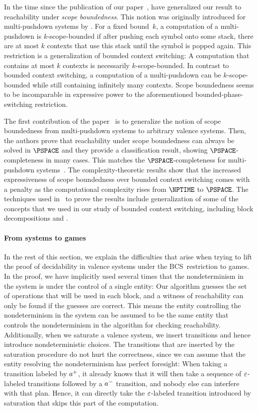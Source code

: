 \documentclass[../../diss.tex]{subfiles}
\begin{document}
In the time since the publication of our paper~\cite{MeyerMZ18},  have generalized our result to reachability under \emph{scope boundedness}.
This notion was originally introduced for multi-pushdown systems by .
For a fixed bound~$k$, a computation of a multi-pushdown is $k$-scope-bounded if after pushing each symbol onto some stack, there are at most $k$ contexts that use this stack until the symbol is popped again.
This restriction is a generalization of bounded context switching: A computation that contains at most $k$ contexts is necessarily $k$-scope-bounded.
In contrast to bounded context switching, a computation of a multi-pushdown can be $k$-scope-bounded while still containing infinitely many contexts.
Scope boundedness seems to be incomparable in expressive power to the aforementioned bounded-phase-switching restriction.

The first contribution of the paper~\cite{ShettyKZ21} is to generalize the notion of scope boundedness from multi-pushdown systems to arbitrary valence systems.
Then, the authors prove that reachability under scope boundedness can always be solved in $\PSPACE$ and they provide a classification result, showing $\PSPACE$-completeness in many cases.
This matches the $\PSPACE$-completeness for multi-pushdown systems~\cite{TorreNP20}.
The complexity-theoretic results show that the increased expressiveness of scope boundedness over bounded context switching comes with a penalty as the computational complexity rises from $\NPTIME$ to $\PSPACE$.
The techniques used in~\cite{ShettyKZ21} to prove the results include generalization of some of the concepts that we used in our study of bounded context switching, including block decompositions and .

\paragraph{From systems to games}

In the rest of this section, we explain the difficulties that arise when trying to lift the proof of decidability in valence systems under the BCS~restriction to games.
In the proof, we have implicitly used several times that the nondeterminism in the system is under the control of a single entity:
Our algorithm guesses the set of operations that will be used in each block, and a witness of reachability can only be found if the guesses are correct.
This means the entity controlling the nondeterminism in the system can be assumed to be the same entity that controls the nondeterminism in the algorithm for checking reachability.
Additionally, when we saturate a valence system, we insert transitions and hence introduce nondeterministic choices.
The transitions that are inserted by the saturation procedure do not hurt the correctness, since we can assume that the entity resolving the nondeterminism has perfect foresight:
When taking a transition labeled by ${a}^+$, it already knows that it will then take a sequence of $\varepsilon$-labeled transitions followed by a ${a}^-$ transition, and nobody else can interfere with that plan.
Hence, it can directly take the $\varepsilon$-labeled transition introduced by saturation that skips this part of the computation.
\end{document}
